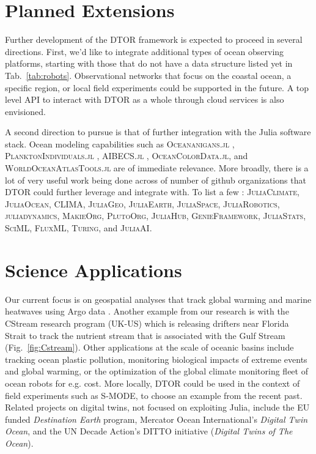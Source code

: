 \documentclass{juliacon}[12pt]
\newcommand{\pkg}[1]{{\small \textsc{#1}}}
\begin{document}
\section{Planned Extensions}

Further development of the DTOR framework is expected to proceed in several directions. First, we'd like to integrate additional types of ocean observing platforms, starting with those that do not have a data structure listed yet in Tab.~\ref{tab:robots}. Observational networks that focus on the coastal ocean, a specific region, or local field experiments could be supported in the future. A top level API to interact with DTOR as a whole through cloud services is also envisioned.

A second direction to pursue is that of further integration with the Julia software stack. Ocean modeling capabilities such as \pkg{Oceananigans.jl} \cite{OceananigansJOSS}, \pkg{PlanktonIndividuals.jl} \cite{Wu2022}, \pkg{AIBECS.jl} \cite{Pasquier2022}, \pkg{OceanColorData.jl}, and \pkg{WorldOceanAtlasTools.jl} are of immediate relevance. More broadly, there is a lot of very useful work being done across of number of github organizations that DTOR could further leverage and integrate with. To list a few : \pkg{JuliaClimate}, \pkg{JuliaOcean}, \pkg{CLIMA}, \pkg{JuliaGeo}, \pkg{JuliaEarth}, \pkg{JuliaSpace}, \pkg{JuliaRobotics}, \pkg{juliadynamics}, \pkg{MakieOrg}, \pkg{PlutoOrg}, \pkg{JuliaHub}, \pkg{GenieFramework}, \pkg{JuliaStats}, \pkg{SciML}, \pkg{FluxML}, \pkg{Turing}, and \pkg{JuliaAI}. 

\section{Science Applications}

Our current focus is on geospatial analyses that track global warming and marine heatwaves using Argo data \cite{Forget2024a}. Another example from our research is with the CStream research program (UK-US) which is releasing drifters near Florida Strait to track the nutrient stream that is associated with the Gulf Stream (Fig.~\ref{fig:Cstream}). Other applications at the scale of oceanic basins include tracking ocean plastic pollution, monitoring biological impacts of extreme events and global warming, or the optimization of the global climate monitoring fleet of ocean robots for e.g. cost. More locally, DTOR could be used in the context of field experiments such as S-MODE, to choose an example from the recent past. Related projects on digital twins, not focused on exploiting Julia, include the EU funded {\it Destination Earth} program, Mercator Ocean International's {\it Digital Twin Ocean}, and the UN Decade Action's DITTO initiative ({\it Digital Twins of The Ocean}).
\end{document}
